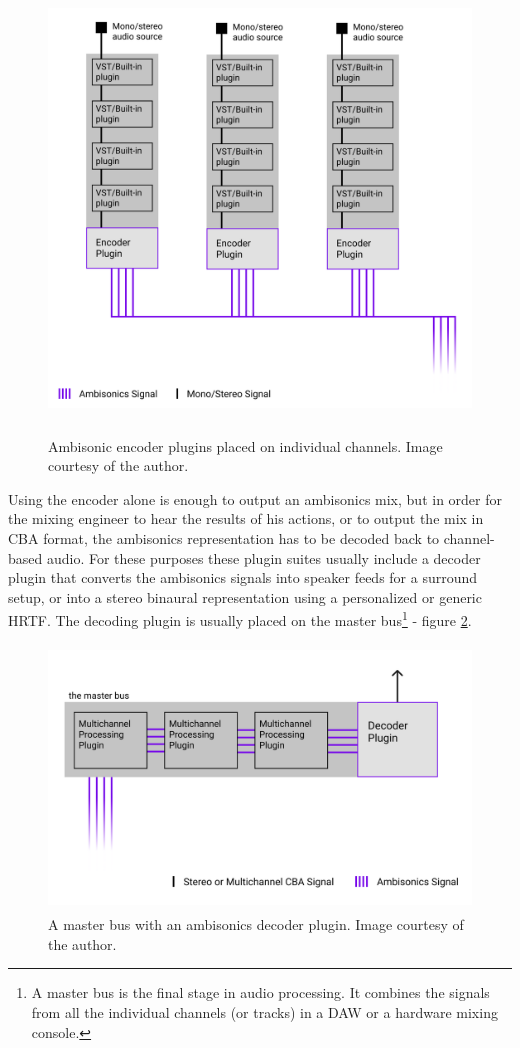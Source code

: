 \begin{figure}
\centering
    \includegraphics[height=32em]{images/daws_vsts/encoders_setup_cropped.png}       
    \caption{Ambisonic encoder plugins placed on individual channels. Image courtesy of the author. \label{fig:encoders_routing}}
\end{figure}

Using the encoder alone is enough to output an ambisonics mix, but in order for the mixing engineer to hear 
the results of his actions, or to output the mix in CBA format, the ambisonics representation has to be decoded back to channel-based audio.
For these purposes these plugin suites usually include a decoder plugin that converts the ambisonics signals into speaker
feeds for a surround setup, or into a stereo binaural representation using a personalized or generic HRTF.
The decoding plugin is usually placed on the master bus\footnote{A master bus is the final stage in audio processing. It combines the signals from all the individual channels (or tracks) in a DAW or a hardware mixing console.}
- figure \ref{fig:decoder_master}.

\begin{figure}
    \centering
    \includegraphics[height=19em]{images/daws_vsts/master_bus_setup_cropped.png}       
    \caption{A master bus with an ambisonics decoder plugin. Image courtesy of the author. \label{fig:decoder_master}}
\end{figure}

